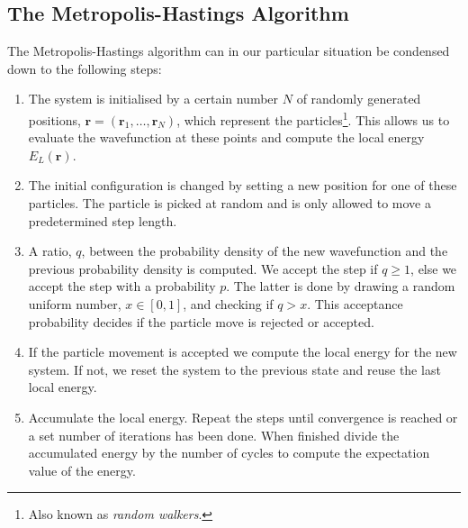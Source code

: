 \documentclass[
    a4paper, aps, twocolumn, floatfix, superscriptaddress,
    nofootinbib]{revtex4-1}
\newcommand{\vf}{\mathbf}
\newcommand{\1}{\mathds{1}}
\begin{document}
    \subsection{The Metropolis-Hastings Algorithm}
        The Metropolis-Hastings algorithm can in our particular situation be
        condensed down to the following steps:

        \begin{enumerate}
            \item The system is initialised by a certain number $N$ of randomly
                generated positions, $\vf{r} = (\vf{r}_1, \dots, \vf{r}_N)$,
                which represent the particles\footnote{Also known as
                \emph{random walkers}.}. This allows us to evaluate the
                wavefunction at these points and compute the local energy
                $E_L(\vf{r})$.

            \item The initial configuration is changed by setting a new position
                for one of these particles. The particle is picked at random and
                is only allowed to move a predetermined step length.


            \item A ratio, $q$, between the probability density of the new
                wavefunction and the previous probability density is computed.
                We accept the step if $q \geq 1$, else we accept the step with a
                probability $p$. The latter is done by drawing a random uniform
                number, $x \in [0, 1]$, and checking if $q > x$.  This
                acceptance probability decides if the particle move is rejected
                or accepted.

            \item If the particle movement is accepted we compute the local
                energy for the new system. If not, we reset the system to the
                previous state and reuse the last local energy.

            \item Accumulate the local energy. Repeat the steps until
                convergence is reached or a set number of iterations has been
                done. When finished divide the accumulated energy by the number
                of cycles to compute the expectation value of the energy.

        \end{enumerate}
\end{document}
